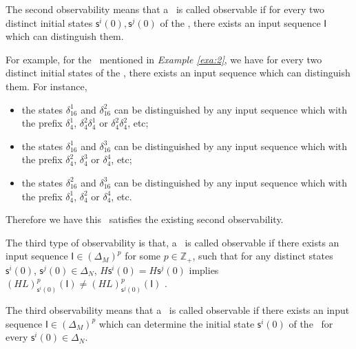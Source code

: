 The second observability means that a \BCN\ is called observable if for every two distinct initial states $\mathsf{s}^{i}(0), \mathsf{s}^{j}(0)$ of the \BCN, there exists an input sequence $\mathsf{I}$ which can distinguish them. 
\begin{example}
For example, for the \BCN\ mentioned in {\em Example \ref{exa:2}}, we have for every two distinct initial states of the \BCN, there exists an input sequence which can distinguish them.  For instance,
\begin{itemize}
  \item the states $\delta_{16}^1$ and $\delta_{16}^2$ can be distinguished by any input sequence which with the prefix $\delta_{4}^1$, $\delta_{4}^2 \delta_{4}^1$ or $\delta_{4}^2 \delta_{4}^2$, etc;
  \item the states $\delta_{16}^1$ and $\delta_{16}^3$  can be distinguished by any input sequence which with the prefix $\delta_{4}^2$, $\delta_{4}^3$ or $\delta_{4}^4$, etc;
  \item the states $\delta_{16}^2$ and $\delta_{16}^3$  can be distinguished by any input sequence which with the prefix $\delta_{4}^1$, $\delta_{4}^2$ or $\delta_{4}^4$, etc.
\end{itemize} 

Therefore we have this \BCN\ satisfies the existing second observability.
\end{example}   
\begin{definition}
The third type of observability is that, a \BCN\ is called observable if there exists an input sequence $\mathsf{I}\in(\Delta_M)^p$ for some $p\in \mathbb{Z}_+$, such that for any distinct states $\mathsf{s}^{i}(0)$, $\mathsf{s}^{j}(0) \in \Delta_N$, $H\mathsf{s}^{i}(0)=H\mathsf{s}^{j}(0)$ implies $(HL)^p_{\mathsf{s}^{i}(0)}(\mathsf{I})\neq (HL)^p_{\mathsf{s}^{j}(0)}(\mathsf{I})$ \cite{Cheng2011Identification}.
\end{definition}

The third observability means that a \BCN\ is called observable if there exists an input sequence $\mathsf{I}\in(\Delta_M)^p$ which can determine the initial state $\mathsf{s}^{i}(0)$ of the \BCN\ for every $\mathsf{s}^{i}(0)\in\Delta_N$.

